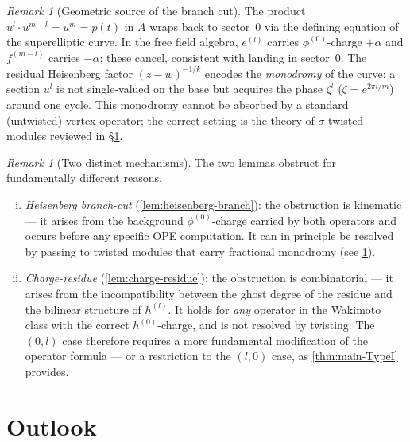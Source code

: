 \documentclass[12pt]{article}
\theoremstyle{plain}
\theoremstyle{definition}
\theoremstyle{remark}
\newtheorem{remark}[theorem]{Remark}
\newcommand{\el}[1]{e^{(#1)}}
\newcommand{\hl}[1]{h^{(#1)}}
\newcommand{\fl}[1]{f^{(#1)}}
\begin{document}
\begin{remark}[Geometric source of the branch cut]
\label{rem:obstruction-source}
  The product $u^l\cdot u^{m-l}=u^m=p(t)$ in $A$ wraps back to sector~$0$
  via the defining equation of the superelliptic curve.
  In the free field algebra, $\el{l}$ carries $\phi^{(0)}$-charge $+\alpha$ and
  $\fl{m-l}$ carries $-\alpha$; these cancel, consistent with landing in sector~$0$.
  The residual Heisenberg factor $(z-w)^{-1/k}$ encodes the \emph{monodromy}
  of the curve: a section $u^l$ is not single-valued on the base but acquires
  the phase $\zeta^l$ ($\zeta=e^{2\pi i/m}$) around one cycle.
  This monodromy cannot be absorbed by a standard (untwisted) vertex operator;
  the correct setting is the theory of $\sigma$-twisted modules reviewed in
  \S\ref{sec:outlook}.
\end{remark}

\begin{remark}[Two distinct mechanisms]
\label{rem:two-mechanisms}
  The two lemmas obstruct for fundamentally different reasons.
  \begin{enumerate}[(i)]
    \item \emph{Heisenberg branch-cut} (\cref{lem:heisenberg-branch}): the
      obstruction is kinematic — it arises from the background $\phi^{(0)}$-charge
      carried by both operators and occurs before any specific OPE computation.
      It can in principle be resolved by passing to twisted modules that carry
      fractional monodromy (see \cref{sec:outlook}).
    \item \emph{Charge-residue} (\cref{lem:charge-residue}): the obstruction is
      combinatorial — it arises from the incompatibility between the ghost degree
      of the residue and the bilinear structure of $\hl{l}$.
      It holds for \emph{any} operator in the Wakimoto class with the correct
      $h^{(0)}$-charge, and is not resolved by twisting.
      The $(0,l)$ case therefore requires a more fundamental modification
      of the operator formula — or a restriction to the $(l,0)$ case, as
      \cref{thm:main-TypeI} provides.
  \end{enumerate}
\end{remark}


\section{Outlook}\label{sec:outlook}
\end{document}

